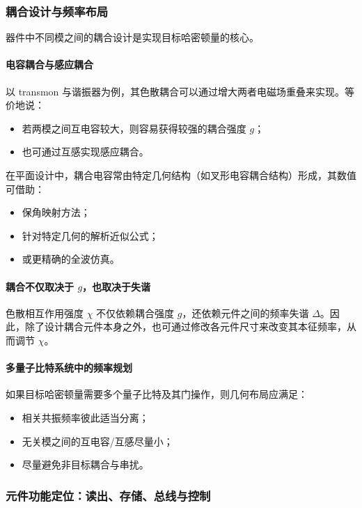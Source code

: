 \documentclass[12pt,a4paper,oneside]{ctexbook}
\begin{document}
\subsubsection{耦合设计与频率布局}

器件中不同模之间的耦合设计是实现目标哈密顿量的核心。

\paragraph{电容耦合与感应耦合}
以 transmon 与谐振器为例，其色散耦合可以通过增大两者电磁场重叠来实现。等价地说：
\begin{itemize}
    \item 若两模之间互电容较大，则容易获得较强的耦合强度 \(g\)；
    \item 也可通过互感实现感应耦合。
\end{itemize}

在平面设计中，耦合电容常由特定几何结构（如叉形电容耦合结构）形成，其数值可借助：
\begin{itemize}
    \item 保角映射方法；
    \item 针对特定几何的解析近似公式；
    \item 或更精确的全波仿真。
\end{itemize}

\paragraph{耦合不仅取决于 \(g\)，也取决于失谐}
色散相互作用强度 \(\chi\) 不仅依赖耦合强度 \(g\)，还依赖元件之间的频率失谐 \(\Delta\)。因此，除了设计耦合元件本身之外，也可通过修改各元件尺寸来改变其本征频率，从而调节 \(\chi\)。

\paragraph{多量子比特系统中的频率规划}
如果目标哈密顿量需要多个量子比特及其门操作，则几何布局应满足：
\begin{itemize}
    \item 相关共振频率彼此适当分离；
    \item 无关模之间的互电容/互感尽量小；
    \item 尽量避免非目标耦合与串扰。
\end{itemize}

\subsubsection{元件功能定位：读出、存储、总线与控制}
\end{document}
